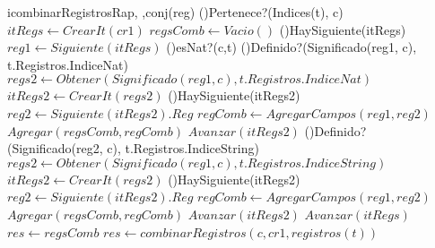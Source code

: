 \begin{Algoritmos}
\begin{algoritmo}{icombinarRegistrosRap}{, ,}{conj(reg)}
	\eIf(){Pertenece?(Indices(t), c)}{
    	$itRegs \gets CrearIt(cr1)$   	
		$regsComb \gets Vacio()$    
		\While(){HaySiguiente(itRegs)}{
    		$reg1 \gets Siguiente(itRegs) $    
	        \eIf(){esNat?(c,t)}{
		       	\If(){Definido?(Significado(reg1, c), t.Registros.IndiceNat)}{
					$regs2 \gets Obtener(Significado(reg1, c), t.Registros.IndiceNat) $ 
                    $itRegs2 \gets CrearIt(regs2) $ 
					\While(){HaySiguiente(itRegs2)}{
                    	$reg2 \gets Siguiente(itRegs2).Reg $ 
                        $regComb \gets AgregarCampos(reg1, reg2) $ 
						$Agregar(regsComb, regComb) $ 
						$Avanzar(itRegs2) $ 
                    }						        	
       			}
        	}{
        		\If(){Definido?(Significado(reg2, c), t.Registros.IndiceString)}{
					$regs2 \gets Obtener(Significado(reg1, c), t.Registros.IndiceString) $ 
                    $itRegs2 \gets CrearIt(regs2) $ 
					\While(){HaySiguiente(itRegs2)}{
                    	$reg2 \gets Siguiente(itRegs2).Reg $ 
                        $regComb \gets AgregarCampos(reg1, reg2) $ 
						$Agregar(regsComb, regComb) $ 
						$Avanzar(itRegs2) $ 
                    }
       			}
        	}
			$Avanzar(itRegs) $ 
    	}
        $res \gets regsComb $    
    }{
    	$res \gets combinarRegistros(c,cr1, registros(t)) $    
    }
	

\end{algoritmo}
\end{Algoritmos}
